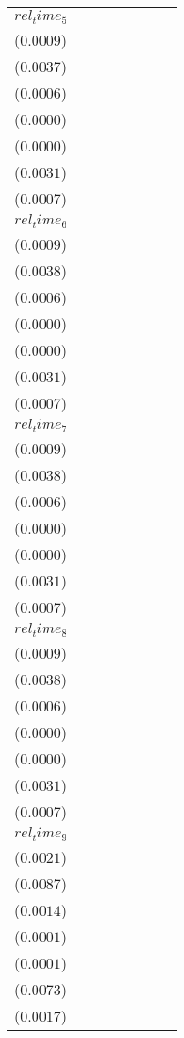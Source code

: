 \begin{tabular}{llllllll}
$rel_time_5$ & \makecell{$0.0031^{***}$ \\ ($0.0009$)} & \makecell{$0.0143^{***}$ \\ ($0.0037$)} & \makecell{$-0.0034^{***}$ \\ ($0.0006$)} & \makecell{$-0.0003^{***}$ \\ ($0.0000$)} & \makecell{$-0.0002^{***}$ \\ ($0.0000$)} & \makecell{$0.0096^{***}$ \\ ($0.0031$)} & \makecell{$0.0019^{***}$ \\ ($0.0007$)} \\
$rel_time_6$ & \makecell{$0.0037^{***}$ \\ ($0.0009$)} & \makecell{$0.0173^{***}$ \\ ($0.0038$)} & \makecell{$-0.0047^{***}$ \\ ($0.0006$)} & \makecell{$-0.0004^{***}$ \\ ($0.0000$)} & \makecell{$-0.0002^{***}$ \\ ($0.0000$)} & \makecell{$0.0114^{***}$ \\ ($0.0031$)} & \makecell{$0.0022^{***}$ \\ ($0.0007$)} \\
$rel_time_7$ & \makecell{$0.0029^{***}$ \\ ($0.0009$)} & \makecell{$0.0127^{***}$ \\ ($0.0038$)} & \makecell{$-0.0048^{***}$ \\ ($0.0006$)} & \makecell{$-0.0004^{***}$ \\ ($0.0000$)} & \makecell{$-0.0002^{***}$ \\ ($0.0000$)} & \makecell{$0.0082^{***}$ \\ ($0.0031$)} & \makecell{$0.0017^{**}$ \\ ($0.0007$)} \\
$rel_time_8$ & \makecell{$0.0032^{***}$ \\ ($0.0009$)} & \makecell{$0.0128^{***}$ \\ ($0.0038$)} & \makecell{$-0.0037^{***}$ \\ ($0.0006$)} & \makecell{$-0.0003^{***}$ \\ ($0.0000$)} & \makecell{$-0.0001^{***}$ \\ ($0.0000$)} & \makecell{$0.0087^{***}$ \\ ($0.0031$)} & \makecell{$0.0020^{***}$ \\ ($0.0007$)} \\
$rel_time_9$ & \makecell{$0.0038^{*}$ \\ ($0.0021$)} & \makecell{$0.0163^{*}$ \\ ($0.0087$)} & \makecell{$-0.0028^{**}$ \\ ($0.0014$)} & \makecell{$-0.0002^{**}$ \\ ($0.0001$)} & \makecell{$-0.0001^{*}$ \\ ($0.0001$)} & \makecell{$0.0112^{}$ \\ ($0.0073$)} & \makecell{$0.0027^{}$ \\ ($0.0017$)} \\

\end{tabular}
